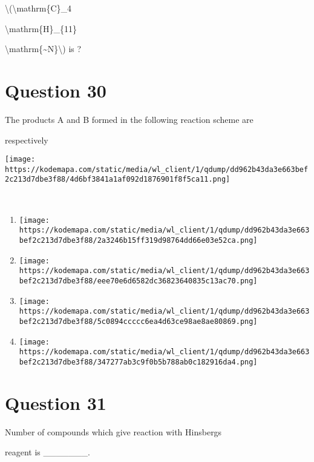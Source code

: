 \documentclass{article}
\begin{document}
\textbackslash(\textbackslash mathrm\{C\}\_4

\textbackslash mathrm\{H\}\_\{11\}

\textbackslash mathrm\{\textasciitilde N\}\textbackslash) is ?


\begin{enumerate}[label=(\alph*)]
\end{enumerate}
\newpage
\section*{Question 30}
The products A and B formed in the following reaction scheme are

respectively



\texttt{[image: https://kodemapa.com/static/media/wl\_client/1/qdump/dd962b43da3e663bef2c213d7dbe3f88/4d6bf3841a1af092d1876901f8f5ca11.png]}\\



{}\strut \\


\begin{enumerate}[label=(\alph*)]
\item \texttt{[image: https://kodemapa.com/static/media/wl\_client/1/qdump/dd962b43da3e663bef2c213d7dbe3f88/2a3246b15ff319d98764dd66e03e52ca.png]}


\item \texttt{[image: https://kodemapa.com/static/media/wl\_client/1/qdump/dd962b43da3e663bef2c213d7dbe3f88/eee70e6d6582dc36823640835c13ac70.png]}


\item \texttt{[image: https://kodemapa.com/static/media/wl\_client/1/qdump/dd962b43da3e663bef2c213d7dbe3f88/5c0894ccccc6ea4d63ce98ae8ae80869.png]}


\item \texttt{[image: https://kodemapa.com/static/media/wl\_client/1/qdump/dd962b43da3e663bef2c213d7dbe3f88/347277ab3c9f0b5b788ab0c182916da4.png]}


\end{enumerate}
\newpage
\section*{Question 31}
Number of compounds which give reaction with Hinsberg\textquotesingle s

reagent is \_\_\_\_\_\_\_.
\end{document}
